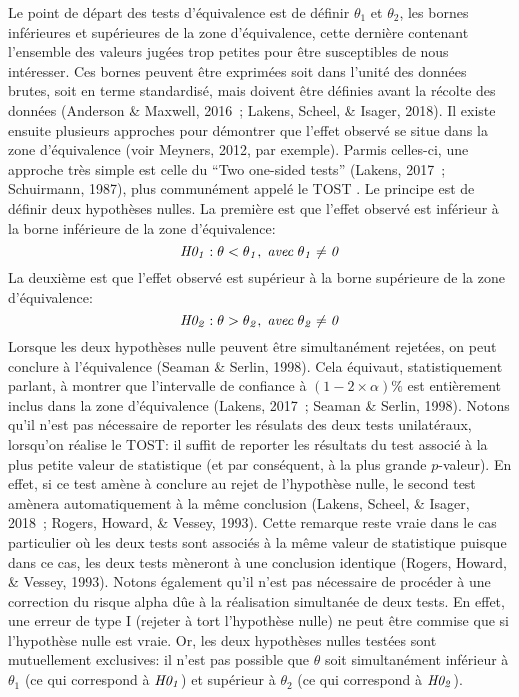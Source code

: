 \documentclass[
  12pt,
  french,
]{article}
\begin{document}
Le point de départ des tests d'équivalence est de définir \(\theta_1\)
et \(\theta_2\), les bornes inférieures et supérieures de la zone
d'équivalence, cette dernière contenant l'ensemble des valeurs jugées
trop petites pour être susceptibles de nous intéresser. Ces bornes
peuvent être exprimées soit dans l'unité des données brutes, soit en
terme standardisé, mais doivent être définies avant la récolte des
données (Anderson \& Maxwell, 2016~; Lakens, Scheel, \& Isager, 2018).
Il existe ensuite plusieurs approches pour démontrer que l'effet observé
se situe dans la zone d'équivalence (voir Meyners, 2012, par exemple).
Parmis celles-ci, une approche très simple est celle du ``Two one-sided
tests'' (Lakens, 2017~; Schuirmann, 1987), plus communément appelé le
TOST
.
Le principe est de définir deux hypothèses nulles. La première est que
l'effet observé est inférieur à la borne inférieure de la zone
d'équivalence:
\[\it H0_1: \theta < \theta_1, \; avec \; \theta_1 \neq 0\] La deuxième
est que l'effet observé est supérieur à la borne supérieure de la zone
d'équivalence:
\[\it H0_2: \theta > \theta_2, \; avec \; \theta_2 \neq 0\] Lorsque les
deux hypothèses nulle peuvent être simultanément rejetées, on peut
conclure à l'équivalence (Seaman \& Serlin, 1998). Cela équivaut,
statistiquement parlant, à montrer que l'intervalle de confiance à
\((1-2\times\alpha)\%\) est entièrement inclus dans la zone
d'équivalence (Lakens, 2017~; Seaman \& Serlin, 1998). Notons qu'il
n'est pas nécessaire de reporter les résulats des deux tests
unilatéraux, lorsqu'on réalise le TOST: il suffit de reporter les
résultats du test associé à la plus petite valeur de statistique (et par
conséquent, à la plus grande \(p\)-valeur). En effet, si ce test amène à
conclure au rejet de l'hypothèse nulle, le second test amènera
automatiquement à la même conclusion (Lakens, Scheel, \& Isager, 2018~;
Rogers, Howard, \& Vessey, 1993). Cette remarque reste vraie dans le cas
particulier où les deux tests sont associés à la même valeur de
statistique puisque dans ce cas, les deux tests mèneront à une
conclusion identique (Rogers, Howard, \& Vessey, 1993). Notons également
qu'il n'est pas nécessaire de procéder à une correction du risque alpha
dûe à la réalisation simultanée de deux tests. En effet, une erreur de
type I (rejeter à tort l'hypothèse nulle) ne peut être commise que si
l'hypothèse nulle est vraie. Or, les deux hypothèses nulles testées sont
mutuellement exclusives: il n'est pas possible que \(\theta\) soit
simultanément inférieur à \(\theta_1\) (ce qui correspond à
\(\it H0_1\)) et supérieur à \(\theta_2\) (ce qui correspond à
\(\it H0_2\)).
\end{document}
